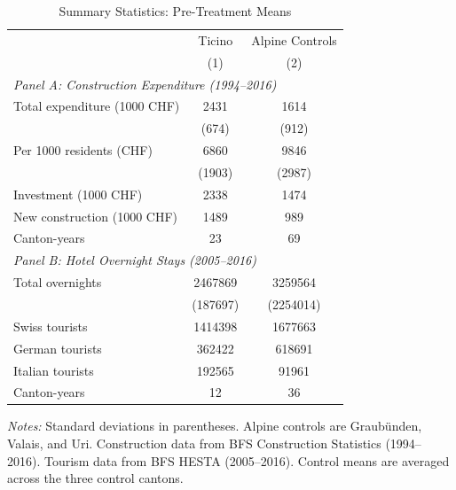 \begin{table}[t]
\centering
\caption{Summary Statistics: Pre-Treatment Means}
\label{tab:summary}
\begin{tabular}{lcc}
\toprule
& Ticino & Alpine Controls \\
& (1) & (2) \\
\midrule
\multicolumn{3}{l}{\textit{Panel A: Construction Expenditure (1994--2016)}} \\[3pt]
Total expenditure (1000 CHF) & 2431 & 1614 \\
& (674) & (912) \\
Per 1000 residents (CHF) & 6860 & 9846 \\
& (1903) & (2987) \\
Investment (1000 CHF) & 2338 & 1474 \\
New construction (1000 CHF) & 1489 & 989 \\
Canton-years & 23 & 69 \\
\midrule
\multicolumn{3}{l}{\textit{Panel B: Hotel Overnight Stays (2005--2016)}} \\[3pt]
Total overnights & 2467869 & 3259564 \\
& (187697) & (2254014) \\
Swiss tourists & 1414398 & 1677663 \\
German tourists & 362422 & 618691 \\
Italian tourists & 192565 & 91961 \\
Canton-years & 12 & 36 \\
\bottomrule
\end{tabular}
\begin{tablenotes}[flushleft]
\small
\item \textit{Notes:} Standard deviations in parentheses. Alpine controls are Graub\"unden, Valais, and Uri. Construction data from BFS Construction Statistics (1994--2016). Tourism data from BFS HESTA (2005--2016). Control means are averaged across the three control cantons.
\end{tablenotes}
\end{table}
